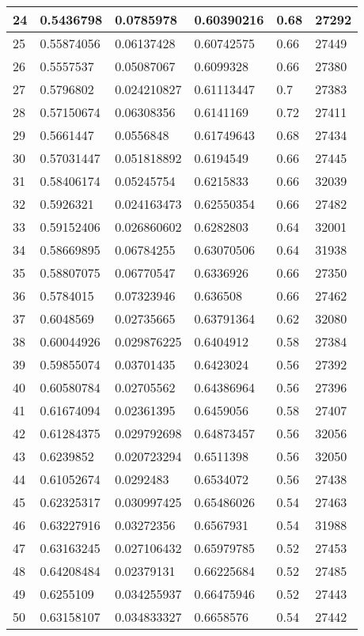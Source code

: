\begin{longtable}{|l|l|l|l|l|l|}
24 & 0.5436798 & 0.0785978 & 0.60390216 & 0.68 & 27292 \\ \hline 
25 & 0.55874056 & 0.06137428 & 0.60742575 & 0.66 & 27449 \\ \hline 
26 & 0.5557537 & 0.05087067 & 0.6099328 & 0.66 & 27380 \\ \hline 
27 & 0.5796802 & 0.024210827 & 0.61113447 & 0.7 & 27383 \\ \hline 
28 & 0.57150674 & 0.06308356 & 0.6141169 & 0.72 & 27411 \\ \hline 
29 & 0.5661447 & 0.0556848 & 0.61749643 & 0.68 & 27434 \\ \hline 
30 & 0.57031447 & 0.051818892 & 0.6194549 & 0.66 & 27445 \\ \hline 
31 & 0.58406174 & 0.05245754 & 0.6215833 & 0.66 & 32039 \\ \hline 
32 & 0.5926321 & 0.024163473 & 0.62550354 & 0.66 & 27482 \\ \hline 
33 & 0.59152406 & 0.026860602 & 0.6282803 & 0.64 & 32001 \\ \hline 
34 & 0.58669895 & 0.06784255 & 0.63070506 & 0.64 & 31938 \\ \hline 
35 & 0.58807075 & 0.06770547 & 0.6336926 & 0.66 & 27350 \\ \hline 
36 & 0.5784015 & 0.07323946 & 0.636508 & 0.66 & 27462 \\ \hline 
37 & 0.6048569 & 0.02735665 & 0.63791364 & 0.62 & 32080 \\ \hline 
38 & 0.60044926 & 0.029876225 & 0.6404912 & 0.58 & 27384 \\ \hline 
39 & 0.59855074 & 0.03701435 & 0.6423024 & 0.56 & 27392 \\ \hline 
40 & 0.60580784 & 0.02705562 & 0.64386964 & 0.56 & 27396 \\ \hline 
41 & 0.61674094 & 0.02361395 & 0.6459056 & 0.58 & 27407 \\ \hline 
42 & 0.61284375 & 0.029792698 & 0.64873457 & 0.56 & 32056 \\ \hline 
43 & 0.6239852 & 0.020723294 & 0.6511398 & 0.56 & 32050 \\ \hline 
44 & 0.61052674 & 0.0292483 & 0.6534072 & 0.56 & 27438 \\ \hline 
45 & 0.62325317 & 0.030997425 & 0.65486026 & 0.54 & 27463 \\ \hline 
46 & 0.63227916 & 0.03272356 & 0.6567931 & 0.54 & 31988 \\ \hline 
47 & 0.63163245 & 0.027106432 & 0.65979785 & 0.52 & 27453 \\ \hline 
48 & 0.64208484 & 0.02379131 & 0.66225684 & 0.52 & 27485 \\ \hline 
49 & 0.6255109 & 0.034255937 & 0.66475946 & 0.52 & 27443 \\ \hline 
50 & 0.63158107 & 0.034833327 & 0.6658576 & 0.54 & 27442 \\ \hline 
\end{longtable}